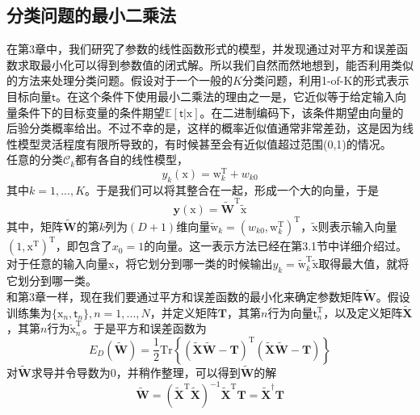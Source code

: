 \documentclass[b5paper]{book}
\numberwithin{equation}{chapter}
\newcommand {\bx} {\boldsymbol{\mathrm{x}}}
\newcommand {\bw} {\boldsymbol{\mathrm{w}}}
\newcommand {\sft} {\boldsymbol{\mathsf{t}}}
\newcommand {\rmT} {\mathrm{T}}
\begin{document}
	\subsection{分类问题的最小二乘法}
	\textnormal{在第3章中，我们研究了参数的线性函数形式的模型，并发现通过对平方和误差函数求取最小化可以得到参数值的闭式解。所以我们自然而然地想到，能否利用类似的方法来处理分类问题。假设对于一个一般的$K$分类问题，利用1-of-K的形式表示目标向量$\sft$。在这个条件下使用最小二乘法的理由之一是，它近似等于给定输入向量条件下的目标变量的条件期望$\mathbb{E}[\sft|\bx]$。在二进制编码下，该条件期望由向量的后验分类概率给出。不过不幸的是，这样的概率近似值通常非常差劲，这是因为线性模型灵活程度有限所导致的，有时候甚至会有近似值超过范围(0,1)的情况。\\
	\indent 任意的分类$\mathcal{C}_k$都有各自的线性模型，
	\begin{equation}
		y_k(\bx) = \bw_k^{\rmT} + w_{k0}
	\end{equation}
	其中$k=1,...,K$。于是我们可以将其整合在一起，形成一个大的向量，于是
	\begin{equation}
		\mathbf{y}(\bx)=\widetilde{\mathbf{W}}^{\rmT} \widetilde{\bx}
	\end{equation}
	其中，矩阵$\widetilde{\mathbf{W}}$的第$k$列为$(D+1)$维向量$\widetilde{\bw}_k = (w_{k0}, \bw_k^{\rmT})^{\rmT}$，$\widetilde{\bx}$则表示输入向量$(1,\bx^{\rmT})^{\rmT}$，即包含了$x_0 = 1$的向量。这一表示方法已经在第3.1节中详细介绍过。对于任意的输入向量$\bx$，将它划分到哪一类的时候输出$y_k = \widetilde{\bw}_k^{\rmT}\widetilde{\bx}$取得最大值，就将它划分到哪一类。\\
	\indent 和第3章一样，现在我们要通过平方和误差函数的最小化来确定参数矩阵$\widetilde{\mathbf{W}}$。假设训练集为$\{\bx_n, \sft_n\}, n=1,...,N$，并定义矩阵$\mathbf{T}$，其第$n$行为向量$\sft_n^{\rmT}$，以及定义矩阵$\widetilde{\mathbf{X}}$，其第$n$行为$\widetilde{\bx}_n^{\rmT}$。于是平方和误差函数为
	\begin{equation}
		E_D(\widetilde{\mathbf{W}})=\frac{1}{2}\mathrm{Tr}\left\{(\widetilde{\mathbf{X}}\widetilde{\mathbf{W}}-\mathbf{T})^{\rmT}(\widetilde{\mathbf{X}}\widetilde{\mathbf{W}}-\mathbf{T})\right\}
	\end{equation}
	对$\widetilde{\mathbf{W}}$求导并令导数为0，并稍作整理，可以得到$\widetilde{\mathbf{W}}$的解
	\begin{equation}
		\widetilde{\mathbf{W}} = (\widetilde{\mathbf{X}}^{\rmT} \widetilde{\mathbf{X}})^{-1}\widetilde{\mathbf{X}}^{\rmT} \mathbf{T} = \widetilde{\mathbf{X}}^{\dagger}\mathbf{T}
	\end{equation}
}
\end{document}
